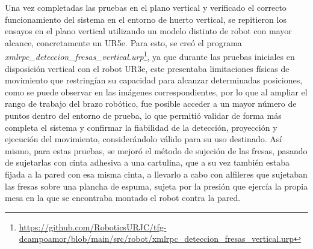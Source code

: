 Una vez completadas las pruebas en el plano vertical y verificado el correcto funcionamiento del sistema en el entorno de huerto vertical, se repitieron los ensayos en el plano vertical utilizando un modelo distinto de robot con mayor alcance, concretamente un UR5e. Para esto, se creó el programa \textit{xmlrpc\_deteccion\_fresas\_vertical.urp}\footnote{\url{https://github.com/RoboticsURJC/tfg-dcampoamor/blob/main/src/robot/xmlrpc\_deteccion\_fresas\_vertical.urp}}, ya que durante las pruebas iniciales en disposición vertical con el robot UR3e, este presentaba limitaciones físicas de movimiento que restringían su capacidad para alcanzar determinadas posiciones, como se puede observar en las imágenes correspondientes, por lo que al ampliar el rango de trabajo del brazo robótico, fue posible acceder a un mayor número de puntos dentro del entorno de prueba, lo que permitió validar de forma más completa el sistema y confirmar la fiabilidad de la detección, proyección y ejecución del movimiento, considerándolo válido para su uso destinado. Así mismo, para estas pruebas, se mejoró el método de sujeción de las fresas, pasando de sujetarlas con cinta adhesiva a una cartulina, que a su vez también estaba fijada a la pared con esa misma cinta, a llevarlo a cabo con alfileres que sujetaban las fresas sobre una plancha de espuma, sujeta por la presión que ejercía la propia mesa en la que se encontraba montado el robot contra la pared.



